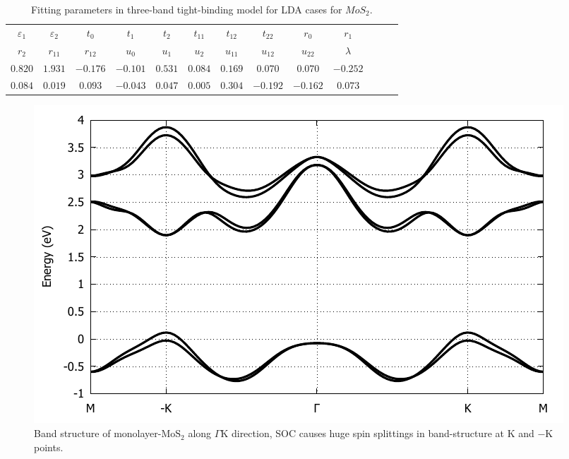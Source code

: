 \documentclass[12pt,english,a4paper]{article}
\begin{document}
\begin{table}[]
	\begin{center}
		\begin{tabular}{c c c c c c c c c c c c c} 
			\hline
			\hline
				$\varepsilon_1$&$\varepsilon_2$&$t_0$&$t_1$&$t_2$&$t_{11}$&$t_{12}$&$t_{22}$&$r_0$&$r_{1}$&\\
				$r_2$&$r_{11}$&$r_{12}$&$u_{0}$&$u_{1}$& $u_{2}$&$u_{11}$&$u_{12}$&$u_{22}$&$\lambda$\\
				\hline
				$0.820$ & $1.931$ & $-0.176$ & $-0.101$ & $0.531$ & $0.084$ & $0.169$ & $0.070$ & $0.070$ & $-0.252$ \\ $0.084$ & $0.019$ & $0.093$ & $-0.043$ & $0.047$ & $0.005$ & $0.304$ & $-0.192$ & $-0.162$ &$0.073$  \\
				\hline
				\hline 
		\end{tabular}
	\caption[Fitting parameters in three-band tight-binding model for $MoS_2$]{Fitting parameters in three-band tight-binding model for \ac{LDA} cases for $MoS_2$.\cite{liu_three-band_2013}}
		\label{3TB Para}
	\end{center}
\end{table}
	\begin{figure}
		\begin{center}
			\includegraphics[width= 0.8\linewidth]{Images/BS.pdf}
\caption[Band structure of $\mathrm{MoS}_2$ material along $\Gamma$K direction]{Band structure of monolayer-$\mathrm{MoS}_2$ along $\Gamma$K direction, SOC causes huge spin splittings in band-structure at $\mathrm{K}$ and $-\mathrm{K}$ points.}
			\label{BS}
		\end{center}
	\end{figure}
 	\newpage
\end{document}
